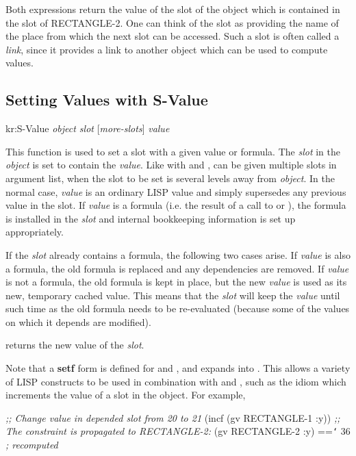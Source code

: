 Both expressions return the value of the  slot of the object
which is contained in the  slot of {\sc RECTANGLE-2}.  One can
think of the slot  as providing the name of the place from which
the next slot can be accessed.  Such a slot is often called a
{\it link}, since it provides a link to another object which can be used to
compute values.


\subsection{Setting Values with S-Value}

\value{f-top}
\begin{example}
kr:S-Value {\it object slot} [{\it more-slots}] {\it value}\value{function}
\end{example}

This function is used to set a slot with a given value or formula.  The
{\it slot} in the {\it object} is set to contain the {\it value}.  Like with
and ,  can be given multiple slots in argument list, when
the slot to be set is several levels away from {\it object}.  In the normal
case, {\it value} is an ordinary LISP value and simply supersedes any previous
value in the slot.  If {\it value} is a formula (i.e.  the result of a call
to  or ), the formula is installed in the {\it slot} and internal bookkeeping information is set up
appropriately.

If the {\it slot} already contains a formula, the following two cases arise.
If {\it value} is also a formula, the old formula is replaced and any
dependencies are removed.  If {\it value} is not a formula, the
old formula is kept in place, but the new {\it value} is used as
its new, temporary cached value.  This means that the {\it slot} will keep
the {\it value} until such time as the old formula needs to be re-evaluated
(because some of the values on which it depends are modified).

 returns the new value of the {\it slot}.

Note that a {\bf setf} form is defined for  and , and
expands into
.  This allows a variety of LISP constructs to be
used in combination with  and , such as the idiom
which increments the value of a slot in the object.  For example,
\begin{programexample}
{\it ;; Change value in depended slot from 20 to 21}
(incf (gv RECTANGLE-1 :y))
{\it ;; The constraint is propagated to RECTANGLE-2:}
(gv RECTANGLE-2 :y) =={\tt\char`\>} 36          {\it ; recomputed}
\end{programexample}

